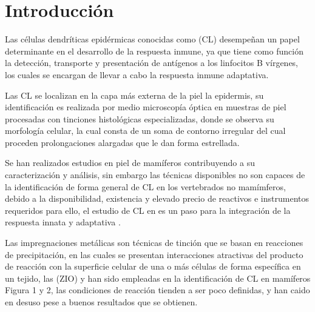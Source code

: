 \section*{Introducción}

Las células dendríticas epidérmicas conocidas como  (CL) desempeñan un papel determinante en el desarrollo de la respuesta inmune, ya que tiene como función la detección, transporte y presentación de antígenos a los linfocitos B vírgenes, los cuales se encargan de llevar a cabo la respuesta inmune adaptativa\cite{article:CL}.

Las CL se localizan en la capa más externa de la piel la epidermis, su identificación es realizada por medio microscopía óptica en muestras de piel procesadas con tinciones histológicas especializadas, donde se observa su morfología celular, la cual consta de un soma de contorno irregular del cual proceden prolongaciones alargadas que le dan forma estrellada.

Se han realizados estudios en piel de mamíferos contribuyendo a su caracterización y análisis, sin embargo las técnicas disponibles no son capaces de la identificación de forma general de CL en los vertebrados no mamímferos, debido a la disponibilidad, existencia y elevado precio de reactivos e instrumentos requeridos para ello, el estudio de CL en  es un paso para la integración de la respuesta innata y adaptativa \cite{article:vertebrados}.

Las impregnaciones metálicas son técnicas de tinción que se basan en reacciones de precipitación, en las cuales se presentan interacciones atractivas del producto de reacción con la superficie celular de una o más células de forma específica en un tejido, las  (ZIO) \cite{article:ZIO} y  \cite{article:ClAu} han sido empleadas en la identificación de CL en mamíferos Figura 1 y 2, las condiciones de reacción tienden a ser poco definidas, y han caido en desuso pese a buenos resultados que se obtienen.

